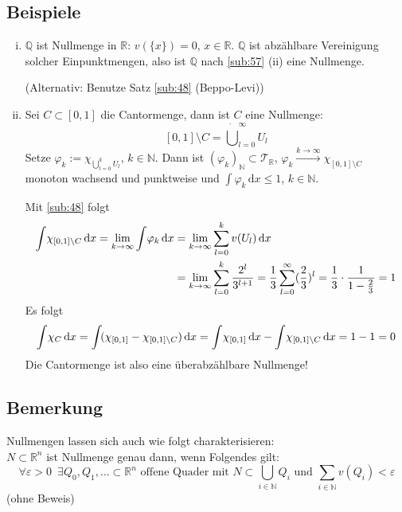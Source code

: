 \subsection[Beispiele für Nullmengen]{Beispiele} %
\label{sub:510}
\begin{enumerate}[(i)]
	\item $\mathds{Q}$ ist Nullmenge in $\mathds{R}$: $v(\{x\}) =0$, $x \in \mathds{R}$. $\mathds{Q}$ ist abzählbare Vereinigung solcher Einpunktmengen, also ist 
	$\mathds{Q}$ nach \ref{sub:57} (ii) eine Nullmenge.
	
	(Alternativ: Benutze Satz \ref{sub:48} (Beppo-Levi))
	\item Sei $C \subset [0,1]$ die Cantormenge, dann ist $C$ eine Nullmenge: 
	\[
		[0,1] \setminus C =  \dot \bigcup_{l=0}^\infty U_l
	\]
	Setze $\varphi_k := \chi_{\bigcup_{l=0}^k U_l}$, $k \in \mathds{N}$. Dann ist $(\varphi_k)_\mathds{N} \subset \mathcal{T}_{\mathds{R}}$, $\varphi_k \xrightarrow{k \to \infty} \chi_{[0,1] \setminus C}$ monoton wachsend und punktweise und $\int\! \varphi_k  \, \mathrm{d}x  \le 1$, $k \in \mathds{N}$.
	
	Mit \ref{sub:48} folgt 
	\begin{align*}
		\int\! \chi_{[0,1] \setminus C}  \, \mathrm{d}x = \lim_{ k \to \infty} \int\! \varphi_k  \, \mathrm{d}x  &= \lim_{ k \to \infty} \sum_{l=0}^{k} v(U_l)  \, \mathrm{d}x \\
		&= \lim_{ k \to \infty} \sum_{l=0}^{k} \frac{2^l}{3^{l+1}} = \frac{1}{3} \sum_{l=0}^{\infty} (\frac{2}{3} )^l = \frac{1}{3} \cdot \frac{1}{1-\frac{2}{3} }
		= 1       
	\end{align*}
	Es folgt 
	\begin{align*}
		\int\! \chi_C  \, \mathrm{d}x = \int\! (\chi_{[0,1]} - \chi_{[0,1] \setminus C})  \, \mathrm{d}x = \int\! \chi_{[0,1]}  \, \mathrm{d}x  - \int\!
		\chi_{[0,1] \setminus C}  \, \mathrm{d}x  = 1-1 = 0 
	\end{align*}
	Die Cantormenge ist also eine überabzählbare Nullmenge! \bewende
\end{enumerate}

\subsection[Bemerkung: Alternative Charakterisierung von Nullmengen]{Bemerkung} %
\label{sub:511}
Nullmengen lassen sich auch wie folgt charakterisieren: \\
$N \subset \mathds{R}^n$ ist Nullmenge genau dann, wenn Folgendes gilt:
\[
	\forall \varepsilon > 0 \enspace \exists Q_0, Q_1, \ldots  \subset \mathds{R}^n  \text{ offene Quader mit } N \subset \bigcup_{i \in \mathds{N}}Q_i \text{ und }
	\sum_{i \in \mathds{N}} v(Q_i) < \varepsilon
\]
(ohne Beweis)

